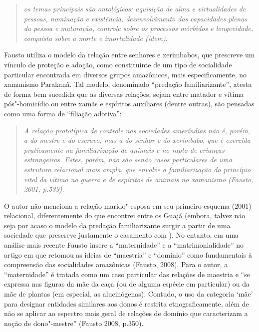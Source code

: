 \begin{quote}
\emph{os temas principais são ontológicos: aquisição de alma e virtualidades
de pessoas, nominação e existência, desenvolvimento das capacidades
plenas da pessoa e maturação, controle sobre os processos mórbidos e
longevidade, conquista sobre a morte e imortalidade (\emph{idem})}.
\end{quote}

Fausto utiliza o modelo da relação entre senhores e xerimbabos, que
prescreve um vínculo de proteção e adoção, como constituinte de um tipo
de socialidade particular encontrada em diversos grupos amazônicos, mais
especificamente, no xamanismo Parakanã. Tal modelo, denominado
``predação familiarizante'', atesta de forma bem sucedida que as
diversas relações, sejam entre matador e vítima pós"-homicídio ou entre
xamãs e espíritos auxiliares (dentre outras), são pensadas como uma
forma de ``filiação adotiva'':

\begin{quote}
\emph{A relação prototípica de controle nas sociedades ameríndias não é,
porém, a do mestre e do escravo, mas a do senhor e do xerimbabo, que é
exercida praticamente na familiarização de animais e no rapto de
crianças estrangeiras. Estes, porém, não são senão casos particulares de
uma estrutura relacional mais ampla, que envolve a familiarização do
princípio vital da vítima na guerra e de espíritos de animais no
xamanismo (Fausto, 2001, p.539)}.
\end{quote}

O autor não menciona a relação marido"-esposa em seu primeiro esquema
(2001) relacional, diferentemente do que encontrei entre os Guajá
(embora, talvez não seja por acaso o modelo da predação familiarizante
surgir a partir de uma sociedade que prescreve justamente o casamento
com ). No entanto, em uma análise mais recente Fausto insere a
``maternidade'' e a ``matrimonialidade'' no artigo em que retomou as ideias
de ``maestria'' e ``domínio'' como fundamentais à compreensão das
socialidades amazônicas (Fausto, 2008). Para o autor, a ``maternidade'' é
tratada como um caso particular das relações de maestria e ``se expressa
nas figuras da mãe da caça (ou de alguma espécie em particular) ou da
mãe de plantas (em especial, as alucinógenas). Contudo, o uso da
categoria `mãe' para designar entidades similares aos donos é restrita
etnograficamente, além de não se aplicar ao espectro mais geral de
relações de domínio que caracterizam a noção de dono"-mestre'' (Fausto
2008, p.350).

